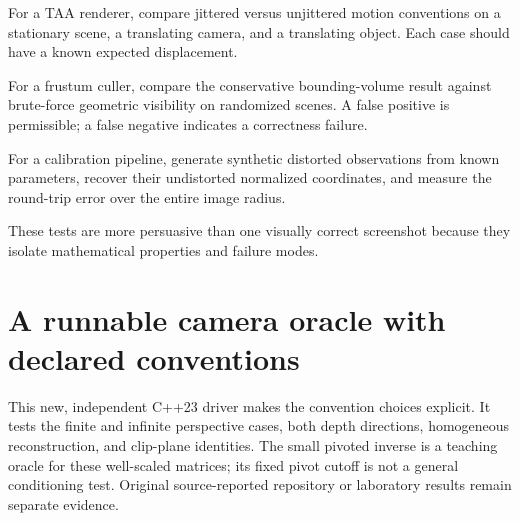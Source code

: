 For a TAA renderer, compare jittered versus unjittered motion conventions on a stationary scene, a translating camera, and a translating object. Each case should have a known expected displacement.

For a frustum culler, compare the conservative bounding-volume result against brute-force geometric visibility on randomized scenes. A false positive is permissible; a false negative indicates a correctness failure.

For a calibration pipeline, generate synthetic distorted observations from known parameters, recover their undistorted normalized coordinates, and measure the round-trip error over the entire image radius.

These tests are more persuasive than one visually correct screenshot because they isolate mathematical properties and failure modes.

\section{A runnable camera oracle with declared conventions}\label{02-foundations-ii-ch037-a-runnable-camera-oracle-with-declared-conventions}

\hypertarget{02-foundations-ii-ch037-a-runnable-camera-oracle-with-declared-conventions}{}

This new, independent C++23 driver makes the convention choices explicit. It tests the finite and infinite perspective cases, both depth directions, homogeneous reconstruction, and clip-plane identities. The small pivoted inverse is a teaching oracle for these well-scaled matrices; its fixed pivot cutoff is not a general conditioning test. Original source-reported repository or laboratory results remain separate evidence.

